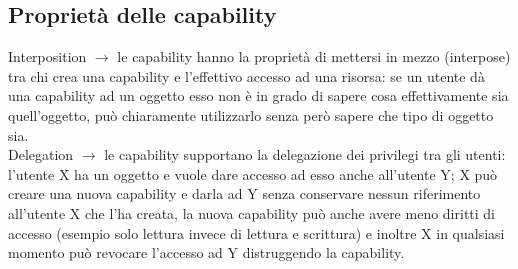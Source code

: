 \subsection{Proprietà delle capability}
Interposition $\rightarrow$ le capability hanno la proprietà di mettersi in mezzo (interpose) tra chi crea una capability e l'effettivo accesso ad una risorsa: se un utente dà una capability ad un oggetto esso non è in grado di sapere cosa effettivamente sia quell'oggetto, può chiaramente utilizzarlo senza però sapere che tipo di oggetto sia.\\
Delegation $\rightarrow$ le capability supportano la delegazione dei privilegi tra gli utenti: l'utente X ha un oggetto e vuole dare accesso ad esso anche all'utente Y; X può creare una nuova capability e darla ad Y senza conservare nessun riferimento all'utente X che l'ha creata, la nuova capability può anche avere meno diritti di accesso (esempio solo lettura invece di lettura e scrittura) e inoltre X in qualsiasi momento può revocare l'accesso ad Y distruggendo la capability.

